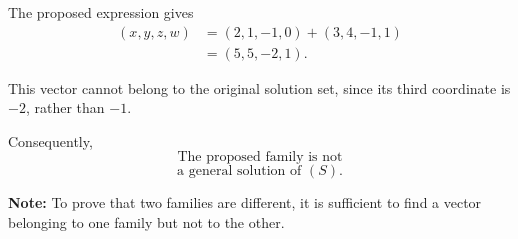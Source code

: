 \begin{enumerate}[label=\alph*)]
\begin{answer}
    The proposed expression gives
    $$
    \begin{aligned}
    (x,y,z,w)
    &=(2,1,-1,0)+(3,4,-1,1)\\
    &=(5,5,-2,1).
    \end{aligned}
    $$

    This vector cannot belong to the original solution set, since its third coordinate
    is $-2$, rather than $-1$.

    Consequently,
    $$
    \boxed{
    \text{The proposed family is not}
    }
    $$
    $$
    \boxed{
    \text{a general solution of }(S).
    }
    $$

    {\color{red}
    \textbf{Note:} To prove that two families are different, it is
    sufficient to find a vector belonging to one family but not to the other.
    }
\end{answer}

\end{enumerate}